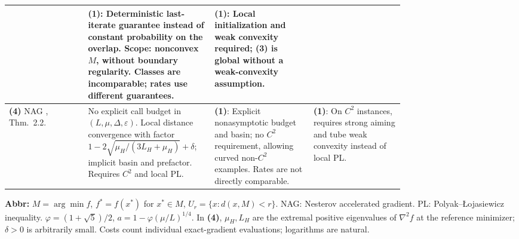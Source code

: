 \begin{table}[tp]
\begin{threeparttable}
\begin{tabularx}{\linewidth}{@{}>{\raggedright\arraybackslash}p{0.20\linewidth}>{\raggedright\arraybackslash}p{0.32\linewidth}>{\raggedright\arraybackslash}p{0.25\linewidth}>{\raggedright\arraybackslash}X@{}}
& \textbf{(1)}: Deterministic last-iterate guarantee instead of constant probability on the overlap. Scope: nonconvex $M$, without boundary regularity. Classes are incomparable; rates use different guarantees.
& \textbf{(1)}: Local initialization and weak convexity required; \textbf{(3)} is global without a weak-convexity assumption. \\
\midrule
\textbf{(4)} NAG \citep{lsaFengYuan2026v1}, Thm.~2.2.
& No explicit call budget in $(L,\mu,\Delta,\varepsilon)$. Local distance convergence with factor $1-2\sqrt{\mu_H/(3L_H+\mu_H)}+\delta$; implicit basin and prefactor. Requires $C^2$ and local PL.
& \textbf{(1)}: Explicit nonasymptotic budget and basin; no $C^2$ requirement, allowing curved non-$C^2$ examples. Rates are not directly comparable.
& \textbf{(1)}: On $C^2$ instances, requires strong aiming and tube weak convexity instead of local PL. \\
\bottomrule
\end{tabularx}
\begin{tablenotes}[flushleft]\footnotesize
\item[] \textbf{Abbr:} $M=\arg\min f$, $f^*=f(x^*)$ for $x^*\in M$, $U_r=\{x:d(x,M)<r\}$. NAG: Nesterov accelerated gradient. PL: Polyak--\L{}ojasiewicz inequality. $\varphi=(1+\sqrt5)/2$, $a=1-\varphi(\mu/L)^{1/4}$. In \textbf{(4)}, $\mu_H,L_H$ are the extremal positive eigenvalues of $\nabla^2 f$ at the reference minimizer; $\delta>0$ is arbitrarily small. Costs count individual exact-gradient evaluations; logarithms are natural.
\end{tablenotes}
\end{threeparttable}
\end{table}
\clearpage
